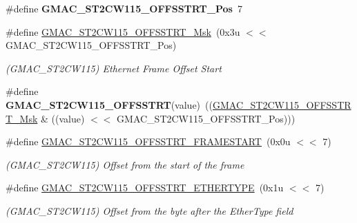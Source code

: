 \begin{DoxyCompactItemize}
\item 
\mbox{\label{group__SAMV71__GMAC_ga6ee2fbe1565cbacf9946df9fb4369632}} 
\#define {\bfseries G\+M\+A\+C\+\_\+\+S\+T2\+C\+W115\+\_\+\+O\+F\+F\+S\+S\+T\+R\+T\+\_\+\+Pos}~7
\item 
\mbox{\label{group__SAMV71__GMAC_ga3c64c58bd0a7ba2c85555617269a0cf5}} 
\#define \mbox{\hyperlink{group__SAMV71__GMAC_ga3c64c58bd0a7ba2c85555617269a0cf5}{G\+M\+A\+C\+\_\+\+S\+T2\+C\+W115\+\_\+\+O\+F\+F\+S\+S\+T\+R\+T\+\_\+\+Msk}}~(0x3u $<$$<$ G\+M\+A\+C\+\_\+\+S\+T2\+C\+W115\+\_\+\+O\+F\+F\+S\+S\+T\+R\+T\+\_\+\+Pos)
\begin{DoxyCompactList}\small\item\em (G\+M\+A\+C\+\_\+\+S\+T2\+C\+W115) Ethernet Frame Offset Start \end{DoxyCompactList}\item 
\mbox{\label{group__SAMV71__GMAC_gaf8bf033e124aa922de6e49d29411a46c}} 
\#define {\bfseries G\+M\+A\+C\+\_\+\+S\+T2\+C\+W115\+\_\+\+O\+F\+F\+S\+S\+T\+RT}(value)~((\mbox{\hyperlink{group__SAMV71__GMAC_ga3c64c58bd0a7ba2c85555617269a0cf5}{G\+M\+A\+C\+\_\+\+S\+T2\+C\+W115\+\_\+\+O\+F\+F\+S\+S\+T\+R\+T\+\_\+\+Msk}} \& ((value) $<$$<$ G\+M\+A\+C\+\_\+\+S\+T2\+C\+W115\+\_\+\+O\+F\+F\+S\+S\+T\+R\+T\+\_\+\+Pos)))
\item 
\mbox{\label{group__SAMV71__GMAC_ga690f96f9f9c3c3062550efbbb00be577}} 
\#define \mbox{\hyperlink{group__SAMV71__GMAC_ga690f96f9f9c3c3062550efbbb00be577}{G\+M\+A\+C\+\_\+\+S\+T2\+C\+W115\+\_\+\+O\+F\+F\+S\+S\+T\+R\+T\+\_\+\+F\+R\+A\+M\+E\+S\+T\+A\+RT}}~(0x0u $<$$<$ 7)
\begin{DoxyCompactList}\small\item\em (G\+M\+A\+C\+\_\+\+S\+T2\+C\+W115) Offset from the start of the frame \end{DoxyCompactList}\item 
\mbox{\label{group__SAMV71__GMAC_gaae9c00137903a38206221d9a99873fc2}} 
\#define \mbox{\hyperlink{group__SAMV71__GMAC_gaae9c00137903a38206221d9a99873fc2}{G\+M\+A\+C\+\_\+\+S\+T2\+C\+W115\+\_\+\+O\+F\+F\+S\+S\+T\+R\+T\+\_\+\+E\+T\+H\+E\+R\+T\+Y\+PE}}~(0x1u $<$$<$ 7)
\begin{DoxyCompactList}\small\item\em (G\+M\+A\+C\+\_\+\+S\+T2\+C\+W115) Offset from the byte after the Ether\+Type field \end{DoxyCompactList}\item 

\end{DoxyCompactItemize}

